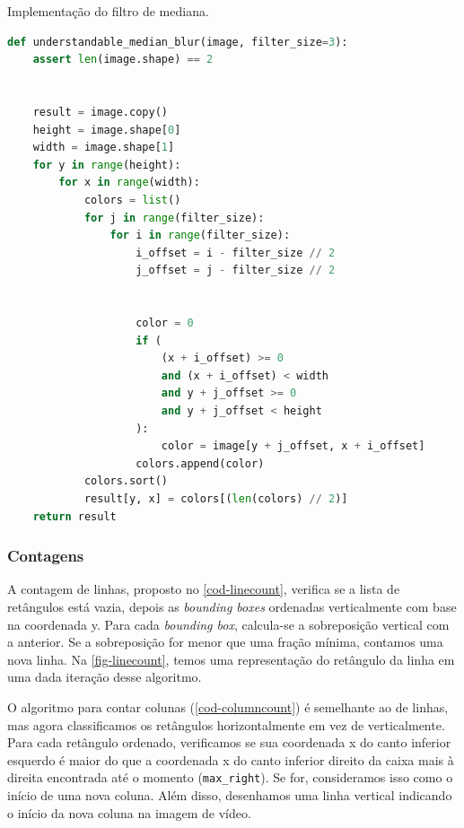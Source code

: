 \documentclass[english, 
               brazil, 
               bsc] %
               {dcomp-abntex2}
\begin{document}
\begin{codigo}[h]
  \caption{\small Implementação do filtro de mediana.}
 \label{cod-mediana}
\begin{lstlisting}[language=python]
def understandable_median_blur(image, filter_size=3):
    assert len(image.shape) == 2


    result = image.copy()
    height = image.shape[0]
    width = image.shape[1]
    for y in range(height):
        for x in range(width):
            colors = list()
            for j in range(filter_size):
                for i in range(filter_size):
                    i_offset = i - filter_size // 2
                    j_offset = j - filter_size // 2


                    color = 0
                    if (
                        (x + i_offset) >= 0
                        and (x + i_offset) < width
                        and y + j_offset >= 0
                        and y + j_offset < height
                    ):
                        color = image[y + j_offset, x + i_offset]
                    colors.append(color)
            colors.sort()
            result[y, x] = colors[(len(colors) // 2)]
    return result
\end{lstlisting}
\end{codigo}


\subsubsection{Contagens} \label{sec-contagem}


A contagem de linhas, proposto no \autoref{cod-linecount}, verifica se a lista de retângulos está vazia, depois as \textit{bounding boxes} ordenadas verticalmente com base na coordenada y. Para cada \textit{bounding box}, calcula-se a sobreposição vertical com a anterior. Se a sobreposição for menor que uma fração mínima, contamos uma nova linha. Na \autoref{fig-linecount}, temos uma representação do retângulo da linha em uma dada iteração desse algoritmo.


O algoritmo para contar colunas (\autoref{cod-columncount}) é semelhante ao de linhas, mas agora classificamos os retângulos horizontalmente em vez de verticalmente. Para cada retângulo ordenado, verificamos se sua coordenada x do canto inferior esquerdo é maior do que a coordenada x do canto inferior direito da caixa mais à direita encontrada até o momento (\texttt{max\_right}). Se for, consideramos isso como o início de uma nova coluna. Além disso, desenhamos uma linha vertical indicando o início da nova coluna na imagem de vídeo.
\end{document}
